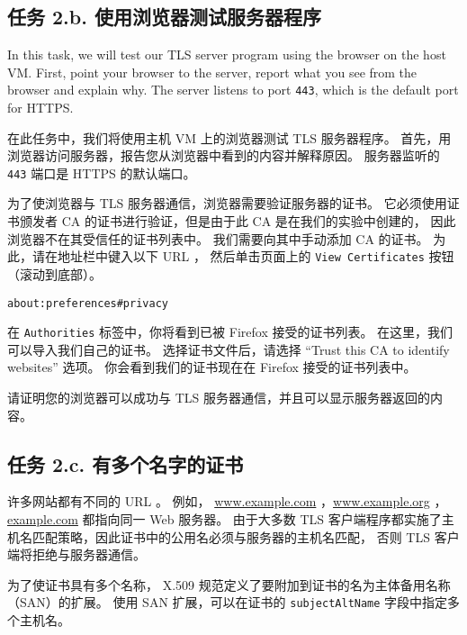 \subsection{任务 2.b. 使用浏览器测试服务器程序}


In this task, we will test our TLS server program using the browser on the host VM. First, point your browser to the server, report what you see from the browser and explain why. The server listens to port \texttt{443}, which is the default port for HTTPS.

在此任务中，我们将使用主机 VM 上的浏览器测试 TLS 服务器程序。
首先，用浏览器访问服务器，报告您从浏览器中看到的内容并解释原因。
服务器监听的 \texttt{443} 端口是 HTTPS 的默认端口。

为了使浏览器与 TLS 服务器通信，浏览器需要验证服务器的证书。
它必须使用证书颁发者 CA 的证书进行验证，但是由于此 CA 是在我们的实验中创建的，
因此浏览器不在其受信任的证书列表中。
我们需要向其中手动添加 CA 的证书。
为此，请在地址栏中键入以下 URL ，
然后单击页面上的 \texttt{View Certificates} 按钮（滚动到底部）。

\begin{lstlisting}
about:preferences#privacy
\end{lstlisting}

在 \texttt{Authorities} 标签中，你将看到已被 Firefox 接受的证书列表。
在这里，我们可以导入我们自己的证书。
选择证书文件后，请选择 ``Trust this CA to identify websites'' 选项。
你会看到我们的证书现在在 Firefox 接受的证书列表中。


请证明您的浏览器可以成功与 TLS 服务器通信，并且可以显示服务器返回的内容。



\subsection{任务 2.c. 有多个名字的证书}

许多网站都有不同的 URL 。
例如， \url{www.example.com} ，\url{www.example.org} ， \url{example.com}
都指向同一 Web 服务器。
由于大多数 TLS 客户端程序都实施了主机名匹配策略，因此证书中的公用名必须与服务器的主机名匹配，
否则 TLS 客户端将拒绝与服务器通信。

为了使证书具有多个名称， X.509 规范定义了要附加到证书的名为主体备用名称（SAN）的扩展。
使用 SAN 扩展，可以在证书的 \texttt{subjectAltName} 字段中指定多个主机名。

